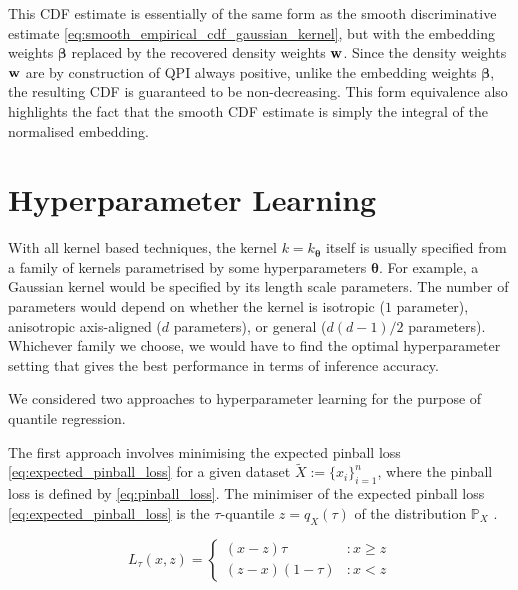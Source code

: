 \documentclass[twoside]{article} \usepackage{aistats2017}
\theoremstyle{definition}
\newcommand{\rv}[1]{{#1}}
\newcommand{\ds}[1]{\tilde{#1}}
\newcommand{\qpi}{QPI }
\begin{document}
	This CDF estimate is essentially of the same form as the smooth discriminative estimate \eqref{eq:smooth_empirical_cdf_gaussian_kernel}, but with the embedding weights $\bm{\beta}$ replaced by the recovered density weights $\mathbf{w}$. Since the density weights $\mathbf{w}$ are by construction of \qpi always positive, unlike the embedding weights $\bm{\beta}$, the resulting CDF is guaranteed to be non-decreasing. This form equivalence also highlights the fact that the smooth CDF estimate is simply the integral of the normalised embedding.
		
\section{Hyperparameter Learning}
\label{sec:hyperparameter_learning}

	With all kernel based techniques, the kernel $k = k_{\bm{\theta}}$ itself is usually specified from a family of kernels parametrised by some hyperparameters $\bm{\theta}$. For example, a Gaussian kernel would be specified by its length scale parameters. The number of parameters would depend on whether the kernel is isotropic ($1$ parameter), anisotropic axis-aligned ($d$ parameters), or general ($d(d - 1)/2$ parameters). Whichever family we choose, we would have to find the optimal hyperparameter setting that gives the best performance in terms of inference accuracy.
	
	We considered two approaches to hyperparameter learning for the purpose of quantile regression.
	
	
	The first approach involves minimising the expected pinball loss \eqref{eq:expected_pinball_loss} for a given dataset $\ds{X} := \{x_{i}\}_{i = 1}^{n}$, where the pinball loss is defined by \eqref{eq:pinball_loss}. The minimiser of the expected pinball loss \eqref{eq:expected_pinball_loss} is the $\tau$-quantile $z = q_{\rv{X}}(\tau)$ of the distribution $\mathbb{P}_{\rv{X}}$ \citep{Koenker1978}.
	
	\begin{equation}
		L_{\tau}(x, z) = \left\{ \begin{array}{lr}
			(x - z) \tau & : x \geq z \\
			(z - x) (1 - \tau) & : x < z
		\end{array} \right.
	\label{eq:pinball_loss}
	\end{equation}
	
\end{document}

